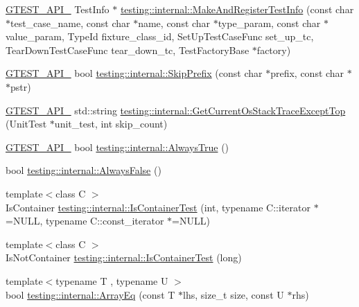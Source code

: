 \begin{DoxyCompactItemize}
\item 
\hyperlink{gtest-port_8h_aa73be6f0ba4a7456180a94904ce17790}{G\+T\+E\+S\+T\+\_\+\+A\+P\+I\+\_\+} Test\+Info $\ast$ \hyperlink{namespacetesting_1_1internal_a8280dfb4f7c8d5b71184f91f4725f759}{testing\+::internal\+::\+Make\+And\+Register\+Test\+Info} (const char $\ast$test\+\_\+case\+\_\+name, const char $\ast$name, const char $\ast$type\+\_\+param, const char $\ast$value\+\_\+param, Type\+Id fixture\+\_\+class\+\_\+id, Set\+Up\+Test\+Case\+Func set\+\_\+up\+\_\+tc, Tear\+Down\+Test\+Case\+Func tear\+\_\+down\+\_\+tc, Test\+Factory\+Base $\ast$factory)
\item 
\hyperlink{gtest-port_8h_aa73be6f0ba4a7456180a94904ce17790}{G\+T\+E\+S\+T\+\_\+\+A\+P\+I\+\_\+} bool \hyperlink{namespacetesting_1_1internal_a244d9a3765727306b597b8992ab84036}{testing\+::internal\+::\+Skip\+Prefix} (const char $\ast$prefix, const char $\ast$$\ast$pstr)
\item 
\hyperlink{gtest-port_8h_aa73be6f0ba4a7456180a94904ce17790}{G\+T\+E\+S\+T\+\_\+\+A\+P\+I\+\_\+} std\+::string \hyperlink{namespacetesting_1_1internal_aeb475922b8cd1e6c60ac052bbc396e62}{testing\+::internal\+::\+Get\+Current\+Os\+Stack\+Trace\+Except\+Top} (Unit\+Test $\ast$unit\+\_\+test, int skip\+\_\+count)
\item 
\hyperlink{gtest-port_8h_aa73be6f0ba4a7456180a94904ce17790}{G\+T\+E\+S\+T\+\_\+\+A\+P\+I\+\_\+} bool \hyperlink{namespacetesting_1_1internal_a922c9da63cd4bf94fc473b9ecac76414}{testing\+::internal\+::\+Always\+True} ()
\item 
bool \hyperlink{namespacetesting_1_1internal_a4b24c851ab13569b1b15b3d259b60d2e}{testing\+::internal\+::\+Always\+False} ()
\item 
{\footnotesize template$<$class C $>$ }\\Is\+Container \hyperlink{namespacetesting_1_1internal_acb6ea1086293c1d6636e3c67941351fb}{testing\+::internal\+::\+Is\+Container\+Test} (int, typename C\+::iterator $\ast$=N\+U\+L\+L, typename C\+::const\+\_\+iterator $\ast$=N\+U\+L\+L)
\item 
{\footnotesize template$<$class C $>$ }\\Is\+Not\+Container \hyperlink{namespacetesting_1_1internal_af545a2ae928b8a9e7581978234464275}{testing\+::internal\+::\+Is\+Container\+Test} (long)
\item 
{\footnotesize template$<$typename T , typename U $>$ }\\bool \hyperlink{namespacetesting_1_1internal_af4bebf36baf0b0a5b26d051dde55fa47}{testing\+::internal\+::\+Array\+Eq} (const T $\ast$lhs, size\+\_\+t size, const U $\ast$rhs)
$$
\end{DoxyCompactItemize}
